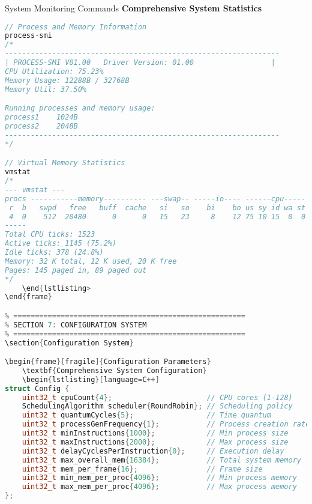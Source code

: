 \documentclass[10pt]{beamer}
\begin{document}
\begin{frame}[fragile]{System Monitoring Commands}
    \textbf{Comprehensive System Statistics}
    \begin{lstlisting}[language=C++]
// Process and Memory Information
process-smi
/*
----------------------------------------------------------------
| PROCESS-SMI V01.00   Driver Version: 01.00                  |
CPU Utilization: 75.23%
Memory Usage: 12288B / 32768B
Memory Util: 37.50%

Running processes and memory usage:
process1    1024B
process2    2048B
----------------------------------------------------------------
*/

// Virtual Memory Statistics  
vmstat
/*
--- vmstat ---
procs -----------memory---------- ---swap-- -----io---- ------cpu-----
 r  b   swpd   free   buff  cache   si   so    bi    bo us sy id wa st
 4  0    512  20480      0      0   15   23     8    12 75 10 15  0  0
-----
Total CPU ticks: 1523
Active ticks: 1145 (75.2%)
Idle ticks: 378 (24.8%)
Memory: 32 K total, 12 K used, 20 K free
Pages: 145 paged in, 89 paged out
*/
    \end{lstlisting>
\end{frame}

% ======================================================
% SECTION 7: CONFIGURATION SYSTEM
% ======================================================
\section{Configuration System}

\begin{frame}[fragile]{Configuration Parameters}
    \textbf{Comprehensive System Configuration}
    \begin{lstlisting}[language=C++]
struct Config {
    uint32_t cpuCount{4};                      // CPU cores (1-128)
    SchedulingAlgorithm scheduler{RoundRobin}; // Scheduling policy
    uint32_t quantumCycles{5};                 // Time quantum
    uint32_t processGenFrequency{1};           // Process creation rate
    uint32_t minInstructions{1000};            // Min process size
    uint32_t maxInstructions{2000};            // Max process size
    uint32_t delayCyclesPerInstruction{0};     // Execution delay
    uint32_t max_overall_mem{16384};           // Total system memory
    uint32_t mem_per_frame{16};                // Frame size
    uint32_t min_mem_per_proc{4096};           // Min process memory
    uint32_t max_mem_per_proc{4096};           // Max process memory
};
    \end{lstlisting}
    

\end{frame}
\end{document}
